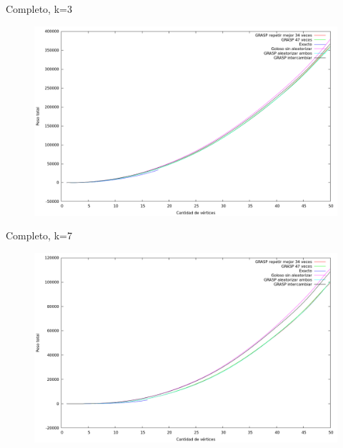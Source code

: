 \vspace*{0.5cm}

Completo, k=3
\vspace*{0.5cm}

\begin{figure}[H]
  \begin{center}
    \includegraphics[scale=0.35]{imagenes/ej6-completo-k3-peso.png}
  \end{center}
\end{figure}

\vspace*{0.5cm}

Completo, k=7
\vspace*{0.5cm}

\begin{figure}[H]
  \begin{center}
    \includegraphics[scale=0.35]{imagenes/ej6-completo-k7-peso.png}
  \end{center}
\end{figure}

